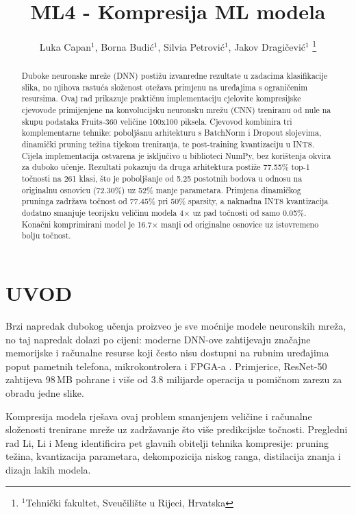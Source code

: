 \documentclass[letterpaper, 10 pt, conference]{ieeeconf}
\title{\LARGE \bf
ML4 - Kompresija ML modela\\
}
\author{
  \parbox{4in}{\centering
    Luka Capan$^{1}$, Borna Budić$^{1}$, Silvia Petrović$^{1}$, Jakov Dragičević$^{1}$
    \thanks{$^{1}$Tehnički fakultet, Sveučilište u Rijeci, Hrvatska}
  }
}
\begin{document}
\maketitle
\thispagestyle{empty}
\pagestyle{empty}

\begin{abstract}
Duboke neuronske mreže (DNN) postižu izvanredne rezultate u zadacima klasifikacije slika, no njihova rastuća složenost otežava primjenu na uređajima s ograničenim resursima.
Ovaj rad prikazuje praktičnu implementaciju cjelovite kompresijske cjevovode primijenjene na konvolucijsku neuronsku mrežu (CNN) treniranu od nule na skupu podataka Fruits-360 veličine 100x100 piksela.
Cjevovod kombinira tri komplementarne tehnike: poboljšanu arhitekturu s BatchNorm i Dropout slojevima, dinamički pruning težina tijekom treniranja, te post-training kvantizaciju u INT8.
Cijela implementacija ostvarena je isključivo u biblioteci NumPy, bez korištenja okvira za duboko učenje.
Rezultati pokazuju da druga arhitektura postiže 77.55\% top-1 točnosti na 261 klasi, što je poboljšanje od 5.25 postotnih bodova u odnosu na originalnu osnovicu (72.30\%) uz 52\% manje parametara.
Primjena dinamičkog pruninga zadržava točnost od 77.45\% pri 50\% sparsity, a naknadna INT8 kvantizacija dodatno smanjuje teorijsku veličinu modela 4$\times$ uz pad točnosti od samo 0.05\%.
Konačni komprimirani model je 16.7$\times$ manji od originalne osnovice uz istovremeno bolju točnost.
\end{abstract}

\section{\textbf{UVOD}}

Brzi napredak dubokog učenja proizveo je sve moćnije modele neuronskih mreža, no taj napredak dolazi po cijeni: moderne DNN-ove zahtijevaju značajne memorijske i računalne resurse koji često nisu dostupni na rubnim uređajima poput pametnih telefona, mikrokontrolera i FPGA-a \cite{li2023survey}.
Primjerice, ResNet-50 zahtijeva 98\,MB pohrane i više od 3.8 milijarde operacija u pomičnom zarezu za obradu jedne slike.

Kompresija modela rješava ovaj problem smanjenjem veličine i računalne složenosti trenirane mreže uz zadržavanje što više predikcijske točnosti.
Pregledni rad Li, Li i Meng \cite{li2023survey} identificira pet glavnih obitelji tehnika kompresije: pruning težina, kvantizacija parametara, dekompozicija niskog ranga, distilacija znanja i dizajn lakih modela.
\end{document}
